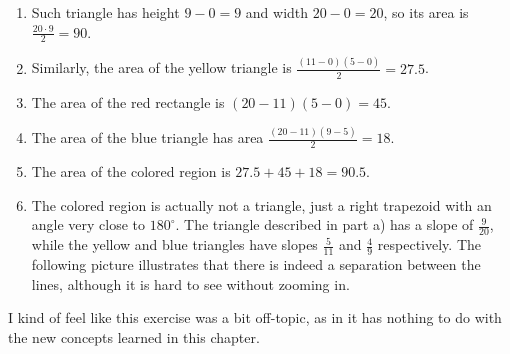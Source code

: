 \documentclass[11pt, a4paper, tikz]{article}
\begin{document}
	\begin{enumerate}[label=\alph*)]
		\item Such triangle has height $9-0=9$ and width $20-0=20$, so its area is $\frac{20\cdot9}{2} = 90$.
		\item Similarly, the area of the yellow triangle is $\frac{(11-0)(5-0)}{2} = 27.5$.
		\item The area of the red rectangle is $(20-11)(5-0) = 45$.
		\item The area of the blue triangle has area $\frac{(20-11)(9-5)}{2} = 18$.
		\item The area of the colored region is $27.5 + 45 + 18 = 90.5$.
		\item The colored region is actually not a triangle, just a right trapezoid with an angle very close to $180^\circ$. The triangle described in part a) has a slope of $\frac{9}{20}$, while the yellow and blue triangles have slopes $\frac{5}{11}$ and $\frac{4}{9}$ respectively. The following picture illustrates that there is indeed a separation between the lines, although it is hard to see without zooming in.
		
	\end{enumerate}
	
	I kind of feel like this exercise was a bit off-topic, as in it has nothing to do with the new concepts learned in this chapter.
\end{document}
